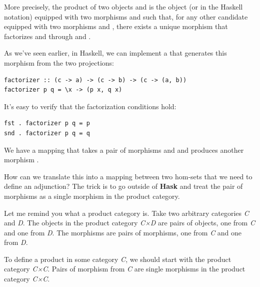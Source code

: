 More precisely, the product of two objects  and  is
the object  (or  in the Haskell
notation) equipped with two morphisms  and  such
that, for any other candidate  equipped with two morphisms
 and , there
exists a unique morphism  that
factorizes  and  through  and
.

As we've seen earlier, in Haskell, we can implement a  that generates this
morphism from the two projections:

\begin{Verbatim}
factorizer :: (c -> a) -> (c -> b) -> (c -> (a, b))
factorizer p q = \x -> (p x, q x)
\end{Verbatim}
It's easy to verify that the factorization conditions hold:

\begin{Verbatim}[commandchars=\\\{\}]
fst . factorizer p q = p
snd . factorizer p q = q
\end{Verbatim}
We have a mapping that takes a pair of morphisms  and
 and produces another morphism
.

How can we translate this into a mapping between two hom-sets that we
need to define an adjunction? The trick is to go outside of
\textbf{Hask} and treat the pair of morphisms as a single morphism in
the product category.

Let me remind you what a product category is. Take two arbitrary
categories \emph{C} and \emph{D}. The objects in the product category
\emph{C×D} are pairs of objects, one from \emph{C} and one from
\emph{D}. The morphisms are pairs of morphisms, one from \emph{C} and
one from \emph{D}.

To define a product in some category \emph{C}, we should start with the
product category \emph{C×C}. Pairs of morphism from \emph{C} are single
morphisms in the product category \emph{C×C}.

\begin{figure}[H]
\centering
{}
\end{figure}

